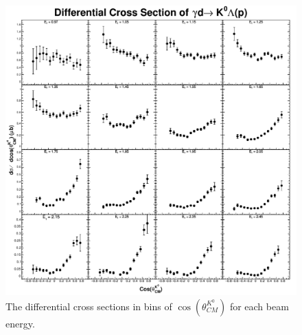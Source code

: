 \documentclass[prb,10pt,twocolumn,tightenlines,superscriptaddress]{revtex4-1}
\begin{document}
\begin{figure}[h]
    \centering
      \includegraphics[width=5.5in, keepaspectratio=true]{crossSection}
    \caption{The differential cross sections in bins of $\cos(\theta^{K^{0}}_{CM})$ for each beam energy.}
        \label{fig:XScosineTheta}%
\end{figure}
\end{document}
